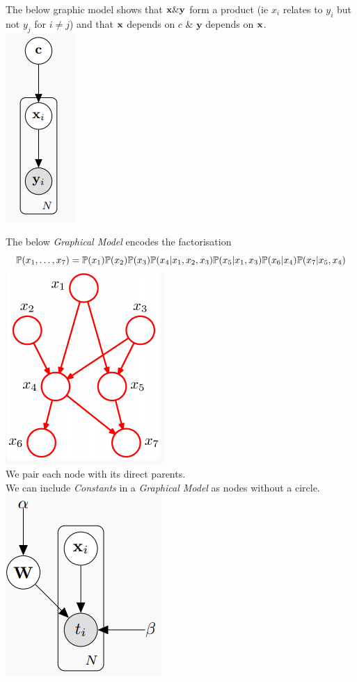 \documentclass[11pt,a4paper]{article}
\begin{document}
The below graphic model shows that $\textbf{x} \& \textbf{y}$ form a product (ie $x_i$ relates to $y_i$ but not $y_j$ for $i\neq j$) and that $\textbf{x}$ depends on $c$ \& $\textbf{y}$ depends on $\textbf{x}$.\\
\includegraphics[scale=.5]{img/graphicalModel1.png}

The below \textit{Graphical Model} encodes the factorisation
$$\mathbb{P}(x_1,\dots,x_7)=\mathbb{P}(x_1)\mathbb{P}(x_2)\mathbb{P}(x_3)\mathbb{P}(x_4|x_1,x_2,x_3)\mathbb{P}(x_5|x_1,x_3)\mathbb{P}(x_6|x_4)\mathbb{P}(x_7|x_5,x_4)$$
\includegraphics[scale=.5]{img/graphicalModel2.png}\\
\nb We pair each node with its direct parents.\\

We can include \textit{Constants} in a \textit{Graphical Model} as nodes without a circle.\\
\includegraphics[scale=.5]{img/graphicalModel3.png}
\end{document}
